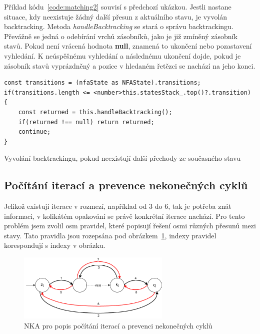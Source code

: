 Příklad kódu~\ref{code:matching2} souvisí s předchozí ukázkou. 
Jestli nastane situace, kdy neexistuje žádný další přesun z aktuálního stavu, je vyvolán backtracking.
Metoda \textit{handleBacktracking} se stará o správu backtrackingu.
Převážně se jedná o odebírání vrchů zásobníků, jako je již zmíněný zásobník stavů.
Pokud není vrácená hodnota \textbf{null}, znamená to ukončení nebo pozastavení vyhledání.
K neúspěšnému vyhledání a následnému ukončení dojde, pokud je zásobník stavů vyprázdněný a pozice v hledaném řetězci se nachází na jeho konci.

\begin{code}[!ht]
	\begin{verbatim}
const transitions = (nfaState as NFAState).transitions;
if(transitions.length <= <number>this.statesStack_.top()?.transition)
{
	const returned = this.handleBacktracking();
	if(returned !== null) return returned;
	continue;
}
	\end{verbatim}
	\caption{Vyvolání backtrackingu, pokud neexistují další přechody ze současného stavu}
	\label{code:matching2}
\end{code}

\newpage

\subsection*{Počítání iterací a prevence nekonečných cyklů}

Jelikož existují iterace v rozmezí, například od 3 do 6, tak je potřeba znát informaci, v kolikátém opakování se právě konkrétní iterace nachází.
Pro tento problém jsem zvolil osm pravidel, které popisují řešení osmi různých přesunů mezi stavy.
Tato pravidla jsou rozepsána pod obrázkem~\ref{fig:ITERCNT}, indexy pravidel korespondují s indexy v obrázku.


\begin{figure}[!h]
	\centering
	\includegraphics[width=0.65\textwidth]{Figures/IterationCount.pdf}
	\caption{NKA pro popis počítání iterací a prevenci nekonečných cyklů}
	\label{fig:ITERCNT}
\end{figure}


